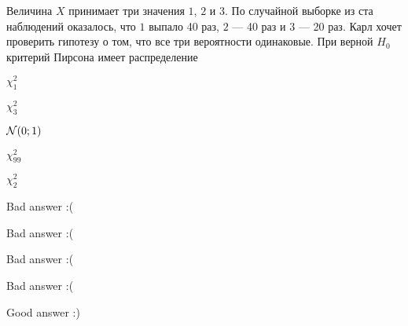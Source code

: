 
\begin{question}
Величина \(X\) принимает три значения \(1\), \(2\) и \(3\). По случайной
выборке из ста наблюдений оказалось, что \(1\) выпало 40 раз, \(2\) ---
40 раз и \(3\) --- 20 раз. Карл хочет проверить гипотезу о том, что все
три вероятности одинаковые. При верной \(H_0\) критерий Пирсона имеет
распределение
\begin{answerlist}
  \item \(\chi^2_1\)
  \item \(\chi^2_3\)
  \item \(\mathcal{N}(0;1)\)
  \item \(\chi^2_{99}\)
  \item \(\chi^2_2\)
\end{answerlist}
\end{question}

\begin{solution}
\begin{answerlist}
  \item Bad answer :(
  \item Bad answer :(
  \item Bad answer :(
  \item Bad answer :(
  \item Good answer :)
\end{answerlist}
\end{solution}

